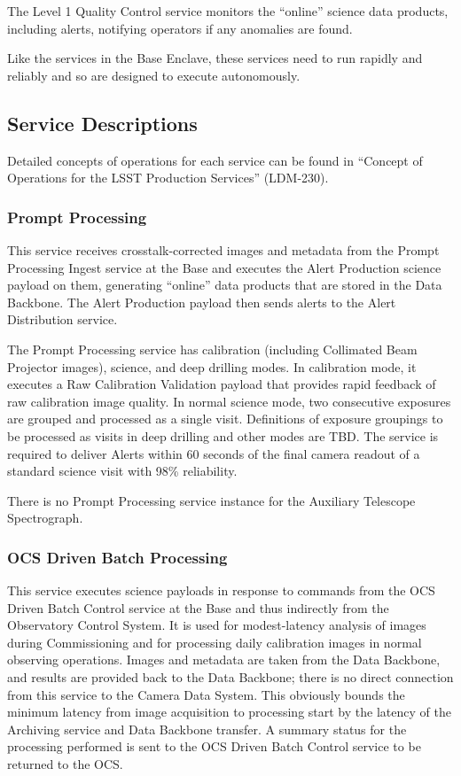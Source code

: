 \documentclass[DM,lsstdraft,toc]{lsstdoc}
\begin{document}
The Level 1 Quality Control service monitors the ``online'' science data
products, including alerts, notifying operators if any anomalies are
found.

Like the services in the Base Enclave, these services need to run
rapidly and reliably and so are designed to execute autonomously.

\subsection{Service Descriptions}\label{ncsa-l1-service-descriptions}

Detailed concepts of operations for each service can be found in
``Concept of Operations for the LSST Production Services'' (LDM-230).

\subsubsection{Prompt Processing}\label{prompt-processing}

This service receives crosstalk-corrected images and metadata from the
Prompt Processing Ingest service at the Base and executes the Alert
Production science payload on them, generating ``online'' data products
that are stored in the Data Backbone. The Alert Production payload then
sends alerts to the Alert Distribution service.

The Prompt Processing service has calibration (including Collimated Beam
Projector images), science, and deep drilling modes. In calibration
mode, it executes a Raw Calibration Validation payload that provides
rapid feedback of raw calibration image quality. In normal science mode,
two consecutive exposures are grouped and processed as a single visit.
Definitions of exposure groupings to be processed as visits in deep
drilling and other modes are TBD. The service is required to deliver
Alerts within 60 seconds of the final camera readout of a standard
science visit with 98\% reliability.

There is no Prompt Processing service instance for the Auxiliary
Telescope Spectrograph.

\subsubsection{OCS Driven Batch
Processing}\label{ocs-driven-batch-processing}

This service executes science payloads in response to commands from the
OCS Driven Batch Control service at the Base and thus indirectly from
the Observatory Control System. It is used for modest-latency analysis
of images during Commissioning and for processing daily calibration
images in normal observing operations. Images and metadata are taken
from the Data Backbone, and results are provided back to the Data
Backbone; there is no direct connection from this service to the Camera
Data System. This obviously bounds the minimum latency from image
acquisition to processing start by the latency of the Archiving service
and Data Backbone transfer. A summary status for the processing
performed is sent to the OCS Driven Batch Control service to be returned
to the OCS.
\end{document}
